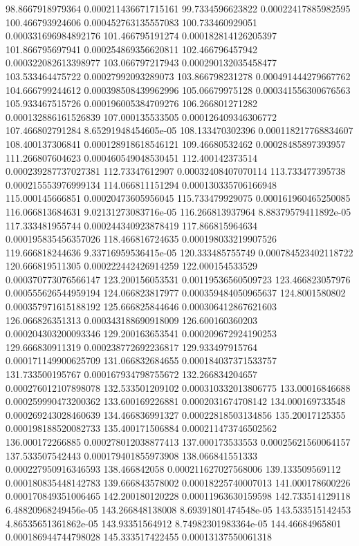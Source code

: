 {98.8667918979364 0.000211436671715161
99.7334596623822 0.00022417885982595
100.466793924606 0.000452763135557083
100.733460929051 0.000331696984892176
101.466795191274 0.000182814126205397
101.866795697941 0.000254869356620811
102.466796457942 0.000322082613398977
103.066797217943 0.000290132035458477
103.533464475722 0.00027992093289073
103.866798231278 0.000491444279667762
104.666799244612 0.000398508439962996
105.06679975128 0.000341556300676563
105.933467515726 0.000196005384709276
106.266801271282 0.000132886161526839
107.000135533505 0.000126409346306772
107.466802791284 8.65291948454605e-05
108.133470302396 0.000118217768834607
108.400137306841 0.000128918618546121
109.46680532462 0.00028485897393957
111.266807604623 0.000460549048530451
112.400142373514 0.000239287737027381
112.73347612907 0.00032408407070114
113.733477395738 0.000215553976999134
114.066811151294 0.000130335706166948
115.000145666851 0.00020473605956045
115.733479929075 0.000161960465250085
116.066813684631 9.02131273083716e-05
116.266813937964 8.88379579411892e-05
117.333481955744 0.000244340923878419
117.866815964634 0.000195835456357026
118.466816724635 0.000198033219907526
119.666818244636 9.33716959536415e-05
120.333485755749 0.000784523402118722
120.666819511305 0.000222442426914259
122.000154533529 0.000370773076566147
123.200156053531 0.00119536560509723
123.466823057976 0.000555626544959194
124.066823817977 0.000359484050965637
124.8001580802 0.000357971615188192
125.666825844646 0.000306412867621603
126.066826351313 0.000343188690918009
126.600160360203 0.000204303200093346
129.200163653541 0.000209672924190253
129.666830911319 0.000238772692236817
129.933497915764 0.000171149900625709
131.066832684655 0.000184037371533757
131.733500195767 0.000167934798755672
132.266834204657 0.000276012107898078
132.533501209102 0.000310332013806775
133.00016846688 0.000259990473200362
133.600169226881 0.0002031674708142
134.000169733548 0.000269243028460639
134.466836991327 0.00022818503134856
135.20017125355 0.000198188520082733
135.400171506884 0.000211473746502562
136.000172266885 0.000278012038877413
137.000173533553 0.00025621560064157
137.533507542443 0.000179401855973908
138.066841551333 0.000227950916346593
138.466842058 0.000211627027568006
139.133509569112 0.000180835448142783
139.666843578002 0.00018225740007013
141.000178600226 0.000170849351006465
142.200180120228 0.00011963630159598
142.733514129118 6.48820968249456e-05
143.266848138008 8.69391801474548e-05
143.533515142453 4.86535651361862e-05
143.93351564912 8.74982301983364e-05
144.46684965801 0.000186944744798028
145.333517422455 0.00013137550061318
}
